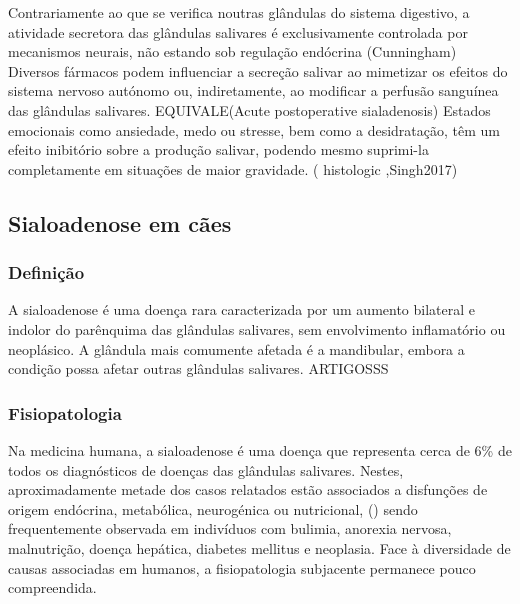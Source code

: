 Contrariamente ao que se verifica noutras glândulas do sistema digestivo, a atividade secretora das glândulas salivares é exclusivamente controlada por mecanismos neurais, não estando sob regulação endócrina (Cunningham) Diversos fármacos podem influenciar a secreção salivar ao mimetizar os efeitos do sistema nervoso autónomo ou, indiretamente, ao modificar a perfusão sanguínea das glândulas salivares. \cite{Cattai2016} EQUIVALE(Acute postoperative sialadenosis) Estados emocionais como ansiedade, medo ou stresse, bem como a desidratação, têm um efeito inibitório sobre a produção salivar, podendo mesmo suprimi-la completamente em situações de maior gravidade. (\cite{Poirier2018} histologic \cite{Bae2024},Singh2017) 


\subsection{Sialoadenose em cães}

\subsubsection{Definição}

A sialoadenose é uma doença rara caracterizada por um aumento bilateral e indolor do parênquima das glândulas salivares, sem envolvimento inflamatório ou neoplásico. A glândula mais comumente afetada é a mandibular, embora a condição possa afetar outras glândulas salivares. ARTIGOSSS

\subsubsection{Fisiopatologia}

Na medicina humana, a sialoadenose é uma doença que representa cerca de 6\% de todos os diagnósticos de doenças das glândulas salivares. \cite{boydell_sialadenosis_2000} Nestes, aproximadamente metade dos casos relatados estão associados a disfunções de origem endócrina, metabólica, neurogénica ou nutricional, (\cite{Trinka2023}) sendo frequentemente observada em indivíduos com bulimia, anorexia nervosa, malnutrição, doença hepática, diabetes mellitus e neoplasia. \cite{Alcoverro2014} Face à diversidade de causas associadas em humanos, a fisiopatologia subjacente permanece pouco compreendida. \cite{Ide2011}


